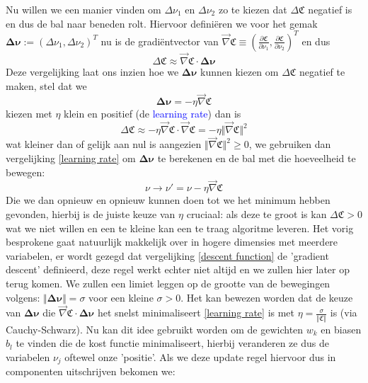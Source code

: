 \documentclass[10pt,a4paper,twoside]{article}
\begin{document}
Nu willen we een manier vinden om $\Delta \nu_1$ en $\Delta \nu_2$ zo te kiezen dat $\Delta \mathfrak{C}$ negatief is en dus de bal naar beneden rolt. Hiervoor definiëren we voor het gemak $\mathbf{\Delta\nu} := (\Delta \nu_1,\Delta \nu_2)^T$ nu is de gradiëntvector van $\vec{\nabla}\mathfrak{C} \equiv (\frac{\partial \mathfrak{C}}{\partial \nu_1},\frac{\partial \mathfrak{C}}{\partial \nu_2})^T$ en dus
\begin{equation}
	\Delta \mathfrak{C} \approx \vec{\nabla} \mathfrak{C} \cdot \mathbf{\Delta \nu}
\end{equation}
Deze vergelijking laat ons inzien hoe we $\mathbf{\Delta \nu}$ kunnen kiezen om $\Delta \mathfrak{C}$ negatief te maken, stel dat we
\begin{equation}
	\mathbf{\Delta \nu} = -\eta \vec{\nabla}\mathfrak{C}
	\label{learning rate}
\end{equation}
kiezen met $\eta$ klein en positief (de \textcolor{blue}{learning rate}) dan is
\begin{equation}
	\Delta \mathfrak{C} \approx -\eta \vec{\nabla}\mathfrak{C}\cdot\vec{\nabla}\mathfrak{C} = -\eta \Vert \vec{\nabla}\mathfrak{C}\Vert^2
\end{equation}
wat kleiner dan of gelijk aan nul is aangezien $\Vert \vec{\nabla}\mathfrak{C}\Vert^2 \geq 0$, we gebruiken dan vergelijking \ref{learning rate} om $\mathbf{\Delta \nu}$ te berekenen en de bal met die hoeveelheid te bewegen:
\begin{equation*}
	\nu \rightarrow \nu ' = \nu - \eta \vec{\nabla} \mathfrak{C}
	\label{descent function}
\end{equation*}
Die we dan opnieuw en opnieuw kunnen doen tot we het minimum hebben gevonden, hierbij is de juiste keuze van $\eta$ cruciaal: als deze te groot is kan $\Delta \mathfrak{C} > 0$ wat we niet willen en een te kleine kan een te traag algoritme leveren. Het vorig besprokene gaat natuurlijk makkelijk over in hogere dimensies met meerdere variabelen, er wordt gezegd dat vergelijking \ref{descent function} de 'gradient descent' definieerd, deze regel werkt echter niet altijd en we zullen hier later op terug komen. We zullen een limiet leggen op de grootte van de bewegingen volgens: $\Vert \mathbf{\Delta \nu} \Vert = \sigma$ voor een kleine $\sigma > 0$. Het kan bewezen worden dat de keuze van $\mathbf{\Delta \nu}$ die $\vec{\nabla} \mathfrak{C} \cdot \mathbf{\Delta \nu}$ het snelst minimaliseert \ref{learning rate} is met $\eta = \frac{\sigma}{\Vert \mathfrak{C} \Vert}$ is (via Cauchy-Schwarz). Nu kan dit idee gebruikt worden om de gewichten $w_k$ en biasen $b_l$ te vinden die de kost functie minimaliseert, hierbij veranderen ze dus de variabelen $\nu_j$ oftewel onze 'positie'. Als we deze update regel hiervoor dus in componenten uitschrijven bekomen we:
\end{document}
